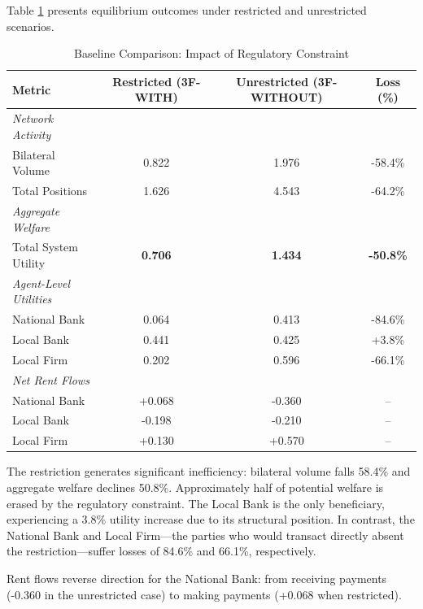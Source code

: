 \documentclass[12pt]{article}
\begin{document}
Table \ref{tab:baseline_comparison} presents equilibrium outcomes under restricted and unrestricted scenarios.

\begin{table}[h]
\centering
\caption{Baseline Comparison: Impact of Regulatory Constraint}
\label{tab:baseline_comparison}
\begin{tabular}{lccc}
\toprule
\textbf{Metric} & \textbf{Restricted (3F-WITH)} & \textbf{Unrestricted (3F-WITHOUT)} & \textbf{Loss (\%)} \\
\midrule
\textit{Network Activity} & & & \\
\quad Bilateral Volume & 0.822 & 1.976 & -58.4\% \\
\quad Total Positions & 1.626 & 4.543 & -64.2\% \\
\midrule
\textit{Aggregate Welfare} & & & \\
\quad Total System Utility & \textbf{0.706} & \textbf{1.434} & \textbf{-50.8\%} \\
\midrule
\textit{Agent-Level Utilities} & & & \\
\quad National Bank & 0.064 & 0.413 & -84.6\% \\
\quad Local Bank & 0.441 & 0.425 & +3.8\% \\
\quad Local Firm & 0.202 & 0.596 & -66.1\% \\
\midrule
\textit{Net Rent Flows} & & & \\
\quad National Bank & +0.068 & -0.360 & -- \\
\quad Local Bank & -0.198 & -0.210 & -- \\
\quad Local Firm & +0.130 & +0.570 & -- \\
\bottomrule
\end{tabular}
\end{table}

The restriction generates significant inefficiency: bilateral volume falls 58.4\% and aggregate welfare declines 50.8\%. Approximately half of potential welfare is erased by the regulatory constraint. The Local Bank is the only beneficiary, experiencing a 3.8\% utility increase due to its structural position. In contrast, the National Bank and Local Firm---the parties who would transact directly absent the restriction---suffer losses of 84.6\% and 66.1\%, respectively.

Rent flows reverse direction for the National Bank: from receiving payments (-0.360 in the unrestricted case) to making payments (+0.068 when restricted). 
\end{document}

